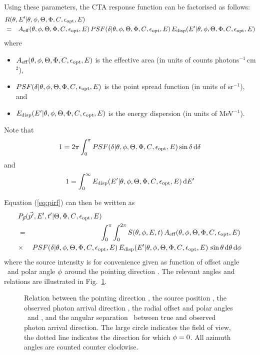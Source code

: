 \documentclass{article}[12pt,a4]
\begin{document}
Using these parameters, the CTA response function can be factorised as follows:
\begin{eqnarray}
\lefteqn{R(\theta, E' | \off, \polar, \zen, \azm, \conf, \opt, E)} \nonumber \\
& = &A_{\rm eff}(\off, \polar, \zen, \azm, \conf, \opt, E) \,
PSF(\psfsep | \off, \polar, \zen, \azm, \conf, \opt, E) \,
E_{\rm disp}(E' | \off, \polar, \zen, \azm, \conf, \opt, E)
\label{eq:ctarsp}
\end{eqnarray}
where
\begin{itemize}
\item $A_{\rm eff}(\mbox{$\theta$}, \mbox{$\phi$}, \mbox{$\Theta$}, \mbox{$\Phi$}, \mbox{$C$}, \mbox{$\epsilon_{\rm opt}$}, E)$ is the effective area 
(in units of counts photons$^{-1}$\,cm$^2$),
\item $PSF(\mbox{$\delta$} | \mbox{$\theta$}, \mbox{$\phi$}, \mbox{$\Theta$}, \mbox{$\Phi$}, \mbox{$C$}, \mbox{$\epsilon_{\rm opt}$}, E)$ is the point spread function
  (in units of sr$^{-1}$), and
\item $E_{\rm disp}(E' | \mbox{$\theta$}, \mbox{$\phi$}, \mbox{$\Theta$}, \mbox{$\Phi$}, \mbox{$C$}, \mbox{$\epsilon_{\rm opt}$}, E)$ is the energy dispersion
  (in units of MeV$^{-1}$).
\end{itemize}
Note that
\begin{equation}
1 = 2 \pi \int_0^{\pi} PSF(\mbox{$\delta$} | \mbox{$\theta$}, \mbox{$\phi$}, \mbox{$\Theta$}, \mbox{$\Phi$}, \mbox{$C$}, \mbox{$\epsilon_{\rm opt}$}, E) \sin \mbox{$\delta$} \, {\rm d}\mbox{$\delta$}
\end{equation}
and
\begin{equation}
1 = \int_0^{\infty} E_{\rm disp}(E' | \mbox{$\theta$}, \mbox{$\phi$}, \mbox{$\Theta$}, \mbox{$\Phi$}, \mbox{$C$}, \mbox{$\epsilon_{\rm opt}$}, E) \, {\rm d}E'
\end{equation}

Equation (\ref{eq:pirf}) can then be written as
\begin{eqnarray}
\lefteqn{P_{\vec{p}}(\vec{p'}, E', t' | \zen, \azm, \conf, \opt, E)} & & \nonumber \\
& = & \int_0^{\pi} \int_0^{2 \pi} 
S(\off, \polar, E, t) \, A_{\rm eff}(\off, \polar, \zen, \azm, \conf, \opt, E) \, \nonumber \\
& \times &
PSF(\psfsep | \off, \polar, \zen, \azm, \conf, \opt, E) \,
E_{\rm disp}(E' | \off, \polar, \zen, \azm, \conf, \opt, E) \,
\sin \off \, {\rm d}\off \, {\rm d}\polar
\label{eq:ctapirf}
\end{eqnarray}
where the source intensity is for convenience given as function of offset angle
\off\ and polar angle $\mbox{$\phi$}$ around the pointing direction \teldir.
The relevant angles and relations are illustrated in Fig.~\ref{fig:ctapsf}.

\begin{figure}[!t]
\center
{}
\caption{Relation between the pointing direction \teldir, the source position \srcdir,
the observed photon arrival direction \phdir, the radial offset and polar angles \off\ and
\polar, and the angular separation \psfsep\ between true and observed photon arrival 
direction.
The large circle indicates the field of view, the dotted line indicates the direction for 
which $\mbox{$\phi$}=0$.
All azimuth angles are counted counter clockwise.
}
 \label{fig:ctapsf}
\end{figure}
\end{document}
